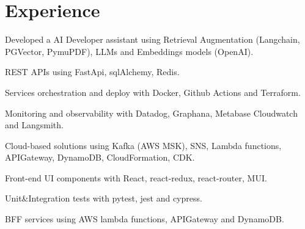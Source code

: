 \documentclass[]{deedy-resume-reversed}
\begin{document}
%
%

%
%

%
%

\begin{minipage}[t]{0.6\textwidth}


\section{Experience}
\vspace{\topsep} %
\begin{tightemize}
\item Developed a AI Developer assistant using Retrieval Augmentation (Langchain, PGVector, PymuPDF), LLMs and Embeddings models (OpenAI).
\item REST APIs using FastApi, sqlAlchemy, Redis.
\item Services orchestration and deploy with Docker, Github Actions and Terraform.
\item Monitoring and observability with Datadog, Graphana, Metabase Cloudwatch and Langsmith.
\item Cloud-based solutions using Kafka (AWS MSK), SNS, Lambda functions, APIGateway, DynamoDB, CloudFormation, CDK.
\item Front-end UI components with React, react-redux, react-router, MUI.
\item Unit\&Integration tests with pytest, jest and cypress.
\item BFF services using AWS lambda functions, APIGateway and DynamoDB.
\end{tightemize}
\sectionsep


\end{minipage}
\end{document}
